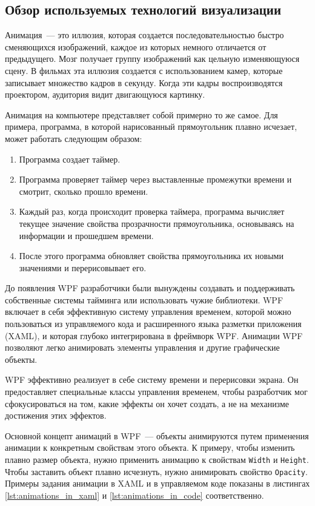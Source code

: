 \subsection{Обзор используемых технологий визуализации}
Анимация~--- это иллюзия, которая создается последовательностью быстро сменяющихся изображений, каждое из которых немного отличается от предыдущего. Мозг получает группу изображений как цельную изменяющуюся сцену. В фильмах эта иллюзия создается с использованием камер, которые записывает множество кадров в секунду. Когда эти кадры воспроизводятся проектором, аудитория видит двигающуюся картинку.

Анимация на компьютере представляет собой примерно то же самое. Для примера, программа, в которой нарисованный прямоугольник плавно исчезает, может работать следующим образом:
\begin{enumerate}
  \item Программа создает таймер.
  \item Программа проверяет таймер через выставленные промежутки времени и смотрит, сколько прошло времени.
  \item Каждый раз, когда происходит проверка таймера, программа вычисляет текущее значение свойства прозрачности прямоугольника, основываясь на информации и прошедшем времени.
  \item После этого программа обновляет свойства прямоугольника их новыми значениями и перерисовывает его.
\end{enumerate}

До появления WPF разработчики были вынуждены создавать и поддерживать собственные системы тайминга или использовать чужие библиотеки. WPF включает в себя эффективную систему управления временем, которой можно пользоваться из управляемого кода и расширенного языка разметки приложения (XAML), и которая глубоко интегрирована в фреймворк WPF. Анимации WPF позволяют легко анимировать элементы управления и другие графические объекты.

WPF эффективно реализует в себе систему времени и перерисовки экрана. Он предоставляет специальные классы управления временем, чтобы разработчик мог сфокусироваться на том, какие эффекты он хочет создать, а не на механизме достижения этих эффектов.

Основной концепт анимаций в WPF~--- объекты анимируются путем применения анимации к конкретным свойствам этого объекта. К примеру, чтобы изменить плавно размер объекта, нужно применить анимацию к свойствам \texttt{Width} и \texttt{Height}. Чтобы заставить объект плавно исчезнуть, нужно анимировать свойство \texttt{Opacity}. Примеры задания анимации в XAML и в управляемом коде показаны в листингах \ref{lst:animations_in_xaml} и \ref{lst:animations_in_code} соответственно.

